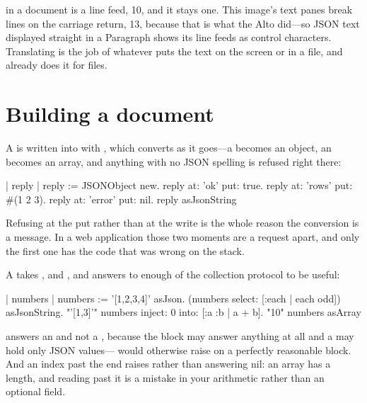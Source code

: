 \begin{stwarn}
\ct{\n} in a document is a line feed, 10, and it stays one. This image's text
panes break lines on the carriage return, 13, because that is what the Alto
did---so JSON text displayed straight in a Paragraph shows its line feeds as
control characters. Translating is the job of whatever puts the text on the
screen or in a file, and  already does it for files.
\end{stwarn}

\section{Building a document}

A  is written into with , which converts as it
goes---a  becomes an object, an  becomes an array,
and anything with no JSON spelling is refused right there:

\begin{st}
| reply |
reply := JSONObject new.
reply at: 'ok' put: true.
reply at: 'rows' put: #(1 2 3).
reply at: 'error' put: nil.
reply asJsonString
\end{st}

Refusing at the put rather than at the write is the whole reason the
conversion is a message. In a web application those two moments are a request
apart, and only the first one has the code that was wrong on the stack.

A  takes ,  and , and answers
to enough of the collection protocol to be useful:

\begin{st}
| numbers |
numbers := '[1,2,3,4]' asJson.
(numbers select: [:each | each odd]) asJsonString.    "'[1,3]'"
numbers inject: 0 into: [:a :b | a + b].              "10"
numbers asArray
\end{st}

\begin{stnote}
 answers an  and not a ,
because the block may answer anything at all and a  may hold
only JSON values--- would otherwise raise
on a perfectly reasonable block. And an index past the end raises rather than
answering nil: an array has a length, and reading past it is a mistake in
your arithmetic rather than an optional field.
\end{stnote}

